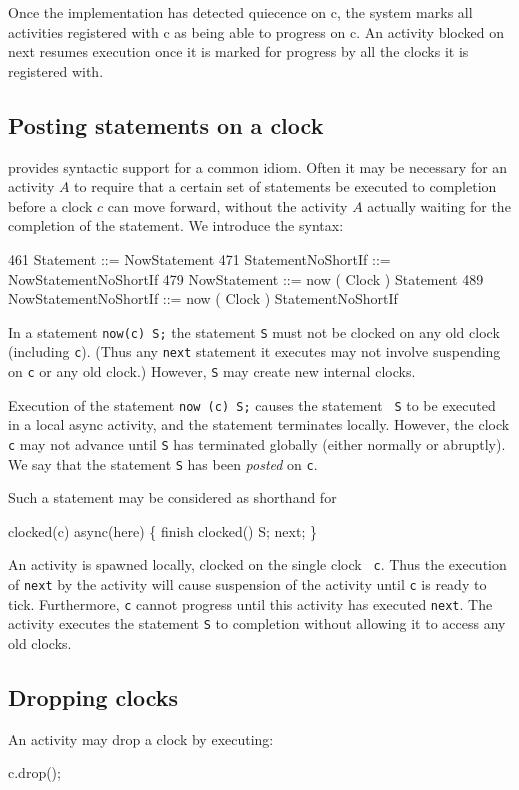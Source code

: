 Once the implementation has detected quiecence on {\cf c}, the system
marks all activities registered with {\cf c} as being able to progress
on {\cf c}. An activity blocked on {\cf next} resumes execution once
it is marked for progress by all the clocks it is registered with.


\subsection{Posting statements on a clock}
\Xten{} provides syntactic support for a common idiom. Often it may be
necessary for an activity $A$ to require that a certain set of
statements be executed to completion before a clock $c$ can move
forward, without the activity $A$ actually waiting for the completion
of the statement. We introduce the syntax:
\begin{x10}
461 Statement ::= NowStatement
471 StatementNoShortIf ::= 
       NowStatementNoShortIf
479 NowStatement ::= 
       now ( Clock ) Statement
489 NowStatementNoShortIf ::= 
       now ( Clock ) StatementNoShortIf
\end{x10}
\noindent 
In a statement {\tt now(c) S;} the statement {\tt S} must not be
clocked on any old clock (including {\tt c}). (Thus any {\tt next}
statement it executes may not involve suspending on {\tt c} or
any old clock.) However, {\tt S} may create new internal clocks.

Execution of the statement {\tt now (c) S;} causes the statement {\tt
S} to be executed in a local async activity, and the statement
terminates locally. However, the clock {\tt c} may not advance until
{\tt S} has terminated globally (either normally or abruptly). We say
that the statement {\tt S} has been {\em posted} on {\tt c}.

Such a statement may be considered as shorthand for
\begin{x10}
  clocked(c) async(here) \{ 
     finish clocked() S; 
     next;
  \}
\end{x10}
An activity is spawned locally, clocked on the single clock {\tt
c}. Thus the execution of {\tt next} by the activity will cause
suspension of the activity until {\tt c} is ready to
tick. Furthermore, {\tt c} cannot progress until this activity has
executed {\tt next}. The activity executes the statement {\tt S} to
completion without allowing it to access any old clocks.

\subsection{Dropping clocks}
An activity may drop a clock by executing:
\begin{x10}
c.drop();
\end{x10}

